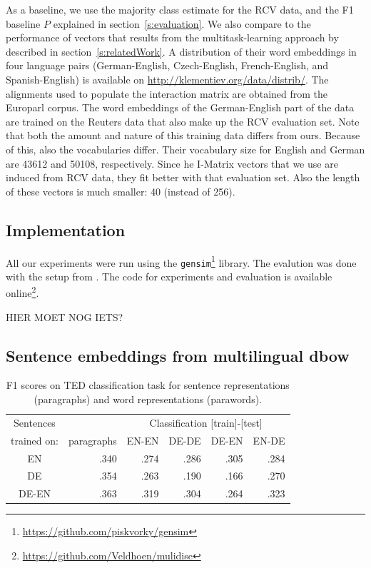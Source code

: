 As a baseline, we use the majority class estimate for the RCV data, and the F1 baseline $P$ explained in section~\ref{s:evaluation}. We also compare to the performance of vectors that results from the multitask-learning approach by \cite{klementiev2012inducing} described in section~\ref{s:relatedWork}. A distribution of their word embeddings in four language pairs (German-English, Czech-English, French-English, and Spanish-English) is available on \url{http://klementiev.org/data/distrib/}. The alignments used to populate the interaction matrix are obtained from the Europarl corpus. The word embeddings of the German-English part of the data are trained on the Reuters data that also make up the RCV evaluation set. Note that both the amount and nature of this training data differs from ours. Because of this, also the vocabularies differ. Their vocabulary size for English and German are 43612 and 50108, respectively. Since he I-Matrix vectors that we use are induced from RCV data, they fit better with that evaluation set. Also the length of these vectors is much smaller: 40 (instead of 256).



\subsection{Implementation}

All our experiments were run using the \texttt{gensim}\footnote{\url{https://github.com/piskvorky/gensim}} library. 
The evalution was done with the setup from \cite{klementiev2012inducing}.
The code for experiments and evaluation is available online\footnote{\url{https://github.com/Veldhoen/mulidise}}.

{\color{red} HIER MOET NOG IETS?}




\subsection{Sentence embeddings from multilingual dbow}
\begin{table}[htb]
\center
\begin{tabular}{c | r|r r r r }
Sentences 		&		&	\multicolumn{4}{c}{Classification [train]-[test]}	\\
trained on: 		&paragraphs	&EN-EN	&DE-DE	&DE-EN	&EN-DE		\\\hline
EN			&.340		&.274		&.286		&.305		&.284		\\
DE			&.354		&.263		&.190		&.166		&.270		\\
DE-EN			&.363		&.319		&.304		&.264		&.323		\\
\end{tabular}
\caption{F1 scores on TED classification task for sentence representations (paragraphs) and word representations (parawords).}
\label{t:dbow_mono_bi}
\end{table}

